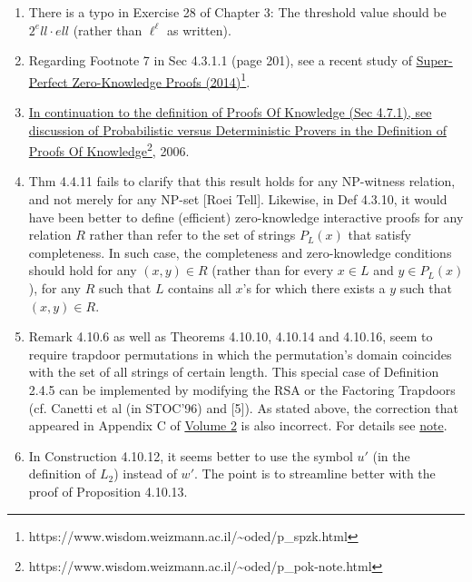 \documentclass[10pt,a4paper]{article}
\begin{document}
\begin{enumerate}
	Both conditions are not used in the text, but I agree that it is a good idea to impose them both. I tend to insert these conditions into Def 3.6.1 and the preamble of Def 3.6.4. Alternatively, it may be inserted into Def 3.6.3 and the first item of Def 3.6.4.
	\item There is a typo in Exercise 28 of Chapter 3: The threshold value should be $2^ell \cdot ell$ (rather than $\ell^\ell$ as written).
	\item Regarding Footnote 7 in Sec 4.3.1.1 (page 201), see a recent study of \href{https://www.wisdom.weizmann.ac.il/~oded/p_spzk.html}{Super-Perfect Zero-Knowledge Proofs (2014)}\footnote{\label{spzk}https://www.wisdom.weizmann.ac.il/\textasciitilde oded/p\_spzk.html}.
	\item \href{https://www.wisdom.weizmann.ac.il/~oded/p_spzk.html}{In continuation to the definition of Proofs Of Knowledge (Sec 4.7.1), see discussion of }\href{https://www.wisdom.weizmann.ac.il/~oded/p_pok-note.html}{Probabilistic versus Deterministic Provers in the Definition of Proofs Of Knowledge}\footnote{https://www.wisdom.weizmann.ac.il/\textasciitilde oded/p\_pok-note.html}, 2006.
	\item Thm 4.4.11 fails to clarify that this result holds for any NP-witness relation, and not merely for any NP-set [Roei Tell]. Likewise, in Def 4.3.10, it would have been better to define (efficient) zero-knowledge interactive proofs for any relation $R$ rather than refer to the set of strings $P_L(x)$ that satisfy completeness. In such case, the completeness and zero-knowledge conditions should hold for any $(x,y)\in R$ (rather than for every $x\in L$ and $y\in P_L(x)$), for any $R$ such that $L$ contains all $x$'s for which there exists a $y$ such that $(x,y)\in R$.
	\item Remark 4.10.6 as well as Theorems 4.10.10, 4.10.14 and 4.10.16, seem to require trapdoor permutations in which the permutation's domain coincides with the set of all strings of certain length. This special case of Definition 2.4.5 can be implemented by modifying the RSA or the Factoring Trapdoors (cf. Canetti et al (in STOC'96) and [5]). As stated above, the correction that appeared in Appendix C of \href{https://www.wisdom.weizmann.ac.il/~oded/foc-vol2.html}{Volume 2} is also incorrect. For details see \href{https://www.wisdom.weizmann.ac.il/~oded/COL/nizk-tdp.pdf}{note}.
	\item In Construction 4.10.12, it seems better to use the symbol $u'$ (in the definition of $L_2$) instead of $w'$. The point is to streamline better with the proof of Proposition 4.10.13.

\end{enumerate}
\end{document}
